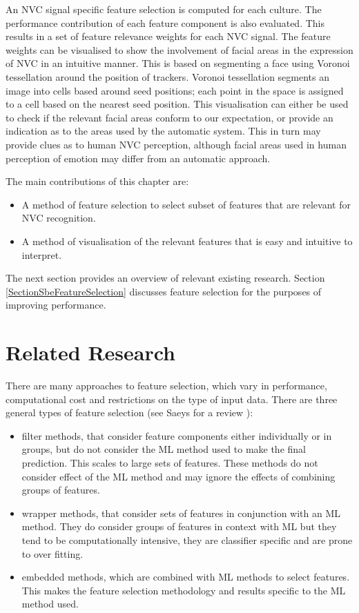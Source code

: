 An \ac{NVC} signal specific feature selection is computed for each culture. The performance contribution of each feature component is also evaluated. This results in a set of feature relevance weights for each \ac{NVC} signal. The feature weights can be visualised to show the involvement of facial areas in the expression of \ac{NVC} in an intuitive manner. This is based on segmenting a face using Voronoi tessellation around the position of trackers. Voronoi tessellation segments an image into cells based around seed positions; each point in the space is assigned to a cell based on the nearest seed position. This visualisation can either be used to check if the relevant facial areas conform to our expectation, or provide an indication as to the areas used by the automatic system. This in turn may provide clues as to human \ac{NVC} perception, although facial areas used in human perception of emotion may differ from an automatic approach.

The main contributions of this chapter are:

\begin{itemize}
 \item A method of feature selection to select subset of features that are relevant for \ac{NVC} recognition.
 \item A method of visualisation of the relevant features that is easy and intuitive to interpret.
\end{itemize}

The next section provides an overview of relevant existing research. Section \ref{SectionSbeFeatureSelection} discusses feature selection for the purposes of improving performance.

\section{Related Research}

There are many approaches to feature selection, which vary in performance, computational cost and restrictions on the type of input data. There are three general types of feature selection (see Saeys \etal for a review \cite{Saeys2007}):

\begin{itemize}
 \item filter methods, that consider feature components either individually or in groups, but do not consider the \ac{ML} method used to make the final prediction. This scales to large sets of features. These methods do not consider effect of the \ac{ML} method and may ignore the effects of combining groups of features.
 \item wrapper methods, that consider sets of features in conjunction with an \ac{ML} method. They do consider groups of features in context with \ac{ML} but they tend to be computationally intensive, they are classifier specific and are prone to over fitting.
 \item embedded methods, which are combined with \ac{ML} methods to select features. This makes the feature selection methodology and results specific to the \ac{ML} method used.
\end{itemize}

